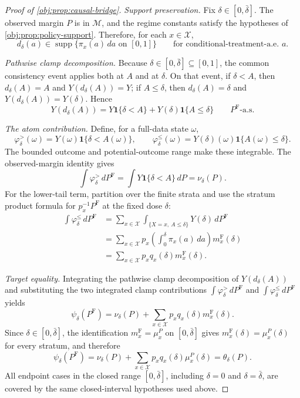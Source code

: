 \begin{proof}[Proof of \cref{obj:prop:causal-bridge}]
\emph{Support preservation.}
Fix \(\delta\in[0,\bar\delta]\).  The observed margin \(P\) is in
\(\mathcal M\), and the regime constants satisfy the hypotheses of
\cref{obj:prop:policy-support}.  Therefore, for each \(x\in\mathcal X\),
\[
d_\delta(a)\in
\operatorname{supp}\{\pi_x(a)\,da\text{ on }[0,1]\}
\qquad
\text{for conditional-treatment-a.e. }a .
\] %

\emph{Pathwise clamp decomposition.}
Because \(\delta\in[0,\bar\delta]\subseteq[0,1]\), the common consistency event
applies both at \(A\) and at \(\delta\).  On that event, if \(\delta<A\), then
\(d_\delta(A)=A\) and \(Y(d_\delta(A))=Y\); if \(A\le\delta\), then
\(d_\delta(A)=\delta\) and \(Y(d_\delta(A))=Y(\delta)\).  Hence
\[
Y(d_\delta(A))
=
Y\mathbf 1\{\delta<A\}
+
Y(\delta)\mathbf 1\{A\le\delta\}
\qquad P^{\mathrm F}\text{-a.s.}
\] %

\emph{The atom contribution.}
Define, for a full-data state \(\omega\),
\[
\varphi_\delta^{> }(\omega)
=
Y(\omega)\mathbf 1\{\delta<A(\omega)\},
\qquad
\varphi_\delta^{\le }(\omega)
=
Y(\delta)(\omega)\mathbf 1\{A(\omega)\le\delta\}.
\]
The bounded outcome and potential-outcome range make these integrable.  The
observed-margin identity gives
\[
\int \varphi_\delta^{>}\,dP^{\mathrm F}
=
\int Y\mathbf 1\{\delta<A\}\,dP
=
\nu_\delta(P).
\]
For the lower-tail term, partition over the finite strata and use the stratum
product formula for \(p_x^{-1}P^{\mathrm F}\) at the fixed dose \(\delta\):
\[
\begin{aligned}
\int \varphi_\delta^{\le}\,dP^{\mathrm F}
&=
\sum_{x\in\mathcal X}
\int_{\{X=x,\ A\le\delta\}}Y(\delta)\,dP^{\mathrm F}  \\
&=
\sum_{x\in\mathcal X}
p_x\left(\int_0^\delta \pi_x(a)\,da\right)m_x^{\mathrm F}(\delta) \\
&=
\sum_{x\in\mathcal X}p_xq_x(\delta)m_x^{\mathrm F}(\delta).
\end{aligned}
\] %

\emph{Target equality.}
Integrating the pathwise clamp decomposition of \(Y(d_\delta(A))\) and substituting
the two integrated clamp contributions \(\int\varphi_\delta^{>}\,dP^{\mathrm F}\) and
\(\int\varphi_\delta^{\le}\,dP^{\mathrm F}\) yields
\[
\psi_\delta(P^{\mathrm F})
=
\nu_\delta(P)+
\sum_{x\in\mathcal X}p_xq_x(\delta)m_x^{\mathrm F}(\delta).
\]
Since \(\delta\in[0,\bar\delta]\), the identification
\(m_x^{\mathrm F}=\mu_x^P\) on \([0,\bar\delta]\) gives
\(m_x^{\mathrm F}(\delta)=\mu_x^P(\delta)\) for every stratum, and therefore
\[
\psi_\delta(P^{\mathrm F})
=
\nu_\delta(P)+
\sum_{x\in\mathcal X}p_xq_x(\delta)\mu_x^P(\delta)
=
\theta_\delta(P).
\]
All endpoint cases in the closed range \([0,\bar\delta]\), including
\(\delta=0\) and \(\delta=\bar\delta\), are covered by the same closed-interval
hypotheses used above. %
\end{proof}

